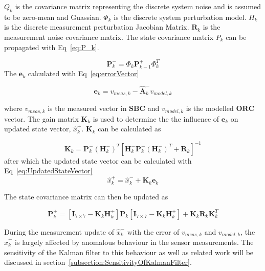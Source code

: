 $Q_k$ is the covariance matrix representing the discrete system noise and is assumed to be zero-mean and Guassian. $\Phi_k$ is the discrete system perturbation model. $H_k$ is the discrete measurement perturbation Jacobian Matrix. $\mathbf{R}_k$ is the measurement noise covariance matrix. The state covariance matrix $P_k$ can be propagated with Eq~\ref{eq:P_k}.

\begin{equation}
	\mathbf{P}_k^- = \Phi_k \mathbf{P}_{k-1}^+ \Phi_k ^T
	\label{eq:P_k}
\end{equation}
The $\mathbf{e}_k$ calculated with Eq~\ref{eq:errorVector}

\begin{equation}
	\mathbf{e}_k = v_{meas,k} - \hat{\mathbf{A}}_k^- v_{model,k}
	\label{eq:errorVector}
\end{equation}

where $v_{meas,k}$ is the measured vector in $\mathbf{SBC}$ and $v_{model,k}$ is the modelled $\mathbf{ORC}$ vector. The gain matrix $\mathbf{K}_k$ is used to determine the the influence of $\mathbf{e}_k$ on updated state vector, $\hat{x}_k^+$. $\mathbf{K}_k$ can be calculated as 

\begin{equation}
	\mathbf{K}_k = \mathbf{P}_k^- (\mathbf{H}_k^-)^T \left[\mathbf{H}_k^- \mathbf{P}_k^- (\mathbf{H}_k^-)^T + \mathbf{R}_k \right]^{-1}
\end{equation}
after which the updated state vector can be calculated with Eq~\ref{eq:UpdatedStateVector}
\begin{equation}
	\hat{x}_k^+ = \hat{x}_k^- + \mathbf{K}_k \mathbf{e}_k
	\label{eq:UpdatedStateVector}
\end{equation}

The state covariance matrix can then be updated as

\begin{equation}
	\mathbf{P}_k^+ = \left[\mathbf{I}_{7 \times 7} - \mathbf{K}_k \mathbf{H}_k^+ \right]\mathbf{P}_k \left[\mathbf{I}_{7 \times 7} - \mathbf{K}_k \mathbf{H}_k^+ \right] + \mathbf{K}_k \mathbf{R}_k \mathbf{K}_k^T
	\label{eq:Updated_P_k}
\end{equation}

During the measurement update of $\hat{x}_k^-$ with the error of $v_{meas,k}$ and $v_{model,k}$, the $\hat{x}_k^+$ is largely affected by anomalous behaviour in the sensor measurements. The sensitivity of the Kalman filter to this behaviour as well as related work will be discussed in section~\ref{subsection:SensitivityOfKalmanFilter}.

